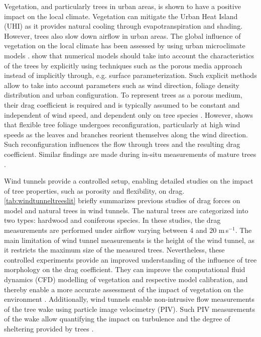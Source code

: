 Vegetation, and particularly trees in urban areas, is shown to have a positive impact on the local climate. Vegetation can mitigate the Urban Heat Island (UHI) as it provides natural cooling through evapotranspiration and shading. However, trees also slow down airflow in urban areas. The global influence of vegetation on the local climate has been assessed by using urban microclimate models \citep{Bruse1998,Robitu2006}. \cite{HefnySalim2015} show that numerical models should take into account the characteristics of the trees by explicitly using techniques such as the porous media approach instead of implicitly through, e.g. surface parameterization. Such explicit methods allow to take into account parameters such as wind direction, foliage density distribution and urban configuration. To represent trees as a porous medium, their drag coefficient is required and is typically assumed to be constant and independent of wind speed, and dependent only on tree species \citep{Wilson1977}. However, \cite{DeLangre2012} shows that flexible tree foliage undergoes reconfiguration, particularly at high wind speeds as the leaves and branches reorient themselves along the wind direction. Such reconfiguration influences the flow through trees and the resulting drag coefficient. Similar findings are made during in-situ measurements of mature trees \citep{Grant1998,Kane2006,Koizumi2016}.

Wind tunnels provide a controlled setup, enabling detailed studies on the impact of tree properties, such as porosity and flexibility, on drag. \cref{tab:windtunneltreeslit} briefly summarizes previous studies of drag forces on model and natural trees in wind tunnels. The natural trees are categorized into two types: hardwood and coniferous species. In these studies, the drag measurements are performed under airflow varying between $4$ and $20$ m\,s$^{-1}$. The main limitation of wind tunnel measurements is the height of the wind tunnel, as it restricts the maximum size of the measured trees. Nevertheless, these controlled experiments provide an improved understanding of the influence of tree morphology on the drag coefficient. They can improve the computational fluid dynamics (CFD) modelling of vegetation and respective model calibration, and thereby enable a more accurate assessment of the impact of vegetation on the environment \citep{Bitog2011,Bitog2012}. Additionally, wind tunnels enable non-intrusive flow measurements of the tree wake using particle image velocimetry (PIV). Such PIV measurements of the wake allow quantifying the impact on turbulence and the degree of sheltering provided by trees \citep{Lee2012,Lee2014565}.

